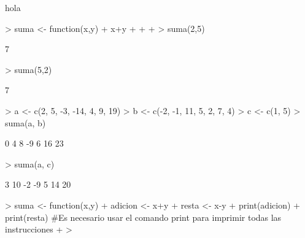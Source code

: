 \documentclass{article}
\begin{document}


hola
\begin{Schunk}
\begin{Sinput}
> suma <- function(x,y){
+   x+y  
+   
+   
+ }
> suma(2,5)
\end{Sinput}
\begin{Soutput}
[1] 7
\end{Soutput}
\begin{Sinput}
> suma(5,2)
\end{Sinput}
\begin{Soutput}
[1] 7
\end{Soutput}
\begin{Sinput}
> a <- c(2, 5, -3, -14, 4, 9, 19)
> b <- c(-2, -1, 11, 5, 2, 7, 4)
> c <- c(1, 5)
> suma(a, b)
\end{Sinput}
\begin{Soutput}
[1]  0  4  8 -9  6 16 23
\end{Soutput}
\begin{Sinput}
> suma(a, c)
\end{Sinput}
\begin{Soutput}
[1]  3 10 -2 -9  5 14 20
\end{Soutput}
\begin{Sinput}
> suma <- function(x,y){
+   adicion <- x+y  
+   resta <- x-y
+   print(adicion)
+   print(resta) #Es necesario usar el comando print para imprimir todas las instrucciones
+ }
> 
\end{Sinput}
\end{Schunk}
\end{document}
